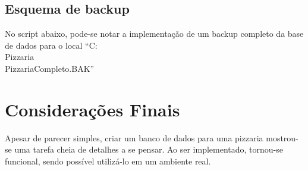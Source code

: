 \documentclass[
	12pt,				%
	openright,			%
	oneside,			%
	a4paper,			%
	chapter=TITLE,		%
	section=TITLE,		%
	english,			%
	brazil				%
	]{abntex2}
\begin{document}
\section{Esquema de backup}

No script abaixo, pode-se notar a implementação de um backup completo da base de dados para o local 
``C:\\Pizzaria\\PizzariaCompleto.BAK''



\chapter*[Considerações]{Considerações Finais}

Apesar de parecer simples, criar um banco de dados para uma pizzaria mostrou-se 
uma tarefa cheia de detalhes a se pensar. Ao ser implementado, tornou-se 
funcional, sendo possível utilizá-lo em um ambiente real.

\postextual

% 


%
%




\end{document}
